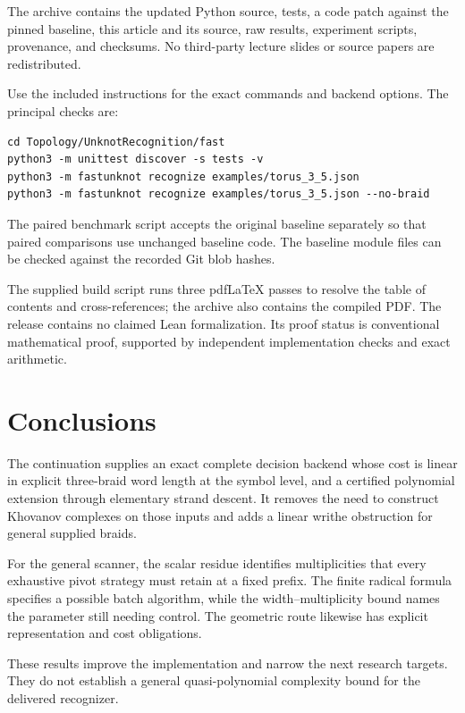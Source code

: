 \documentclass[11pt,letterpaper]{article}
\theoremstyle{definition}
\begin{document}
The archive contains the updated Python source, tests, a code patch
against the pinned baseline, this article and its source, raw results,
experiment scripts, provenance, and checksums. No third-party lecture
slides or source papers are redistributed.

Use the included instructions for the exact commands and backend
options. The principal checks are:
\begin{lstlisting}
cd Topology/UnknotRecognition/fast
python3 -m unittest discover -s tests -v
python3 -m fastunknot recognize examples/torus_3_5.json
python3 -m fastunknot recognize examples/torus_3_5.json --no-braid
\end{lstlisting}
The paired benchmark script accepts the original baseline separately so that
paired comparisons use unchanged baseline code. The baseline module
files can be checked against the recorded Git blob hashes.

The supplied build script runs three pdfLaTeX passes to resolve the table
of contents and cross-references; the archive also contains the compiled
PDF. The release contains no claimed Lean
formalization. Its proof status is conventional mathematical proof,
supported by independent implementation checks and exact arithmetic.

\section{Conclusions}

The continuation supplies an exact complete decision backend whose cost
is linear in explicit three-braid word length at the symbol level,
and a certified polynomial extension through elementary strand descent.
It removes the need to construct Khovanov complexes on those inputs and
adds a linear writhe obstruction for general supplied braids.

For the general scanner, the scalar residue identifies multiplicities
that every exhaustive pivot strategy must retain at a fixed prefix.
The finite radical formula specifies a possible batch algorithm, while
the width--multiplicity bound names the parameter still needing control.
The geometric route likewise has explicit representation and cost
obligations.

These results improve the implementation and narrow the next research
targets. They do not establish a general quasi-polynomial complexity
bound for the delivered recognizer.
\end{document}
